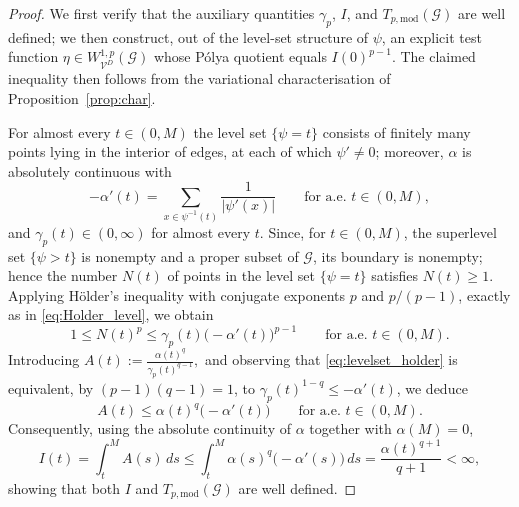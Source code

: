 \documentclass[12pt,a4paper]{article}
\numberwithin{equation}{section}
\newcommand{\WpD}{W^{1,p}_{\mathcal{V}^D}(\mathcal G)}
\begin{document}
	\begin{proof}
		We first verify that the auxiliary
		quantities $\gamma_p$, $I$, and $T_{p,\mathrm{mod}}(\mathcal G)$ are
		well defined; we then construct, out of the level-set structure of
		$\psi$, an explicit test function $\eta\in\WpD$ whose P\'olya quotient
		equals $I(0)^{p-1}$. The claimed inequality then follows from the
		variational characterisation of Proposition~\ref{prop:char}.
		
		
		For almost every $t\in(0,M)$ the level
		set $\{\psi=t\}$ consists of finitely many points lying in the interior
		of edges, at each of which $\psi'\neq0$; moreover, $\alpha$ is
		absolutely continuous with
		\[
		-\alpha'(t)
		=
		\sum_{x\in\psi^{-1}(t)}
		\frac1{|\psi'(x)|}
		\qquad\text{for a.e. }t\in(0,M),
		\]
		and $\gamma_p(t)\in(0,\infty)$ for almost every $t$. Since, for
		$t\in(0,M)$, the superlevel set $\{\psi>t\}$ is nonempty and a proper
		subset of $\mathcal G$, its boundary is nonempty; hence the number
		$N(t)$ of points in the level set $\{\psi=t\}$ satisfies $N(t)\ge1$.
		Applying H\"older's inequality with conjugate exponents $p$ and
		$p/(p-1)$, exactly as in \eqref{eq:Holder_level}, we obtain
		\begin{equation}
			\label{eq:levelset_holder}
			1
			\le
			N(t)^p
			\le
			\gamma_p(t)\bigl(-\alpha'(t)\bigr)^{p-1}
			\qquad
			\text{for a.e. }t\in(0,M).
		\end{equation}
		Introducing
		\(
		A(t):=
		\frac{\alpha(t)^q}{\gamma_p(t)^{q-1}},
		\)
		and observing that \eqref{eq:levelset_holder} is equivalent, by
		$(p-1)(q-1)=1$, to $\gamma_p(t)^{1-q}\le-\alpha'(t)$, we deduce
		\begin{equation}
			\label{eq:A_estimate}
			A(t)
			\le
			\alpha(t)^q\bigl(-\alpha'(t)\bigr)
			\qquad
			\text{for a.e. }t\in(0,M).
		\end{equation}
		Consequently, using the absolute continuity of $\alpha$ together with
		$\alpha(M)=0$,
		\begin{equation}\label{eq:est_on_I}
			I(t)
			=
			\int_t^M A(s)\,ds
			\le
			\int_t^M
			\alpha(s)^q\bigl(-\alpha'(s)\bigr)\,ds
			=
			\frac{\alpha(t)^{q+1}}{q+1}
			<\infty,
		\end{equation}
		showing that both $I$ and $T_{p,\mathrm{mod}}(\mathcal{G})$ are well
		defined.
		

\end{proof}
\end{document}
